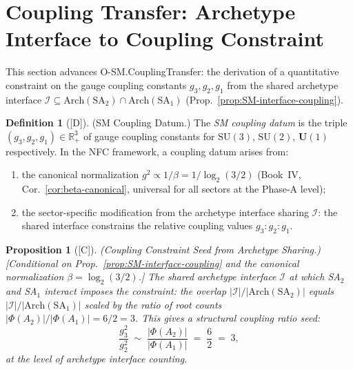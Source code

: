 \documentclass[12pt,oneside]{amsbook}
\theoremstyle{plain}
\newtheorem{proposition}[theorem]{Proposition}
\theoremstyle{definition}
\newtheorem{definition}[theorem]{Definition}
\theoremstyle{remark}
\newcommand{\status}[1]{\textup{[#1]}}
\begin{document}
\section{Coupling Transfer: Archetype Interface to Coupling Constraint}
\label{sec:sm-coupling-transfer}

This section advances O-SM.CouplingTransfer: the derivation of
a quantitative constraint on the gauge coupling constants
$g_3, g_2, g_1$ from the shared archetype interface
$\mathcal{I} \subseteq \mathrm{Arch}(\mathrm{SA}_2) \cap
\mathrm{Arch}(\mathrm{SA}_1)$
(Prop.~\ref{prop:SM-interface-coupling}).

\begin{definition}[\status{D}]\label{def:SM-coupling-datum}
\textup{(SM Coupling Datum.)}
The \emph{SM coupling datum} is the triple
$(g_3, g_2, g_1) \in \mathbb{R}_+^3$ of gauge coupling constants
for $\mathrm{SU}(3)$, $\mathrm{SU}(2)$, $\mathbf{U}(1)$
respectively. In the NFC framework, a coupling datum arises from:
\begin{enumerate}[label=\textup{(\arabic*)}]
 \item the canonical normalization $g^2 \propto 1/\beta =
 1/\log_2(3/2)$ (Book~IV, Cor.~\ref{cor:beta-canonical},
 universal for all sectors at the Phase-A level);
 \item the sector-specific modification from the archetype
 interface sharing $\mathcal{I}$: the shared interface
 constrains the relative coupling values $g_3 : g_2 : g_1$.
\end{enumerate}
\end{definition}

\begin{proposition}[\status{C}]\label{prop:SM-coupling-seed}
\textup{(Coupling Constraint Seed from Archetype Sharing.)}
\textup{[Conditional on Prop.~\ref{prop:SM-interface-coupling}
and the canonical normalization $\beta = \log_2(3/2)$.]}
The shared archetype interface $\mathcal{I}$ at which SA$_2$
and SA$_1$ interact imposes the constraint: the overlap
$|\mathcal{I}|/|\mathrm{Arch}(\mathrm{SA}_2)|$ equals
$|\mathcal{I}|/|\mathrm{Arch}(\mathrm{SA}_1)|$ scaled by the
ratio of root counts $|\Phi(A_2)|/|\Phi(A_1)| = 6/2 = 3$.
This gives a structural coupling ratio seed:
\[
 \frac{g_3^2}{g_2^2} \;\sim\;
 \frac{|\Phi(A_2)|}{|\Phi(A_1)|}
 \;=\; \frac{6}{2} \;=\; 3,
\]
at the level of archetype interface counting.
\end{proposition}
\end{document}
